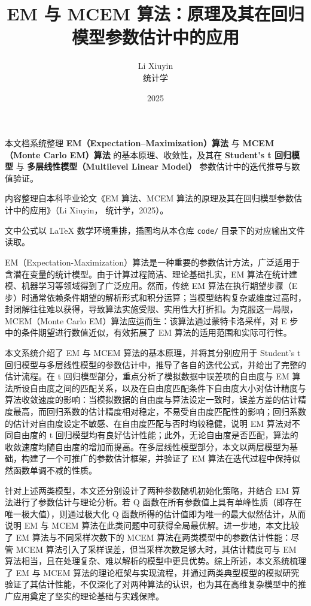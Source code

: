 \documentclass[12pt,a4paper]{ctexart}
\title{\bfseries EM 与 MCEM 算法：原理及其在回归模型参数估计中的应用}
\author{Li Xiuyin\\[2pt]\normalsize 统计学}
\date{2025}
\numberwithin{figure}{section}
\numberwithin{table}{section}
\begin{document}
\maketitle


\begin{framed}
本文档系统整理 \textbf{EM（Expectation–Maximization）算法} 与 \textbf{MCEM（Monte Carlo EM）算法} 的基本原理、收敛性，及其在 \textbf{Student's t 回归模型} 与 \textbf{多层线性模型（Multilevel Linear Model）} 参数估计中的迭代推导与数值验证。

内容整理自本科毕业论文《EM 算法、MCEM 算法的原理及其在回归模型参数估计中的应用》（Li Xiuyin， 统计学，2025）。

文中公式以 LaTeX 数学环境重排，插图均从本仓库 \texttt{code/} 目录下的对应输出文件读取。

\end{framed}

EM（Expectation-Maximization）算法是一种重要的参数估计方法，广泛适用于含潜在变量的统计模型。由于计算过程简洁、理论基础扎实，EM 算法在统计建模、机器学习等领域得到了广泛应用。然而，传统 EM 算法在执行期望步骤（E 步）时通常依赖条件期望的解析形式和积分运算；当模型结构复杂或维度过高时，封闭解往往难以获得，导致算法实施受限、实用性大打折扣。为克服这一局限，MCEM（Monte Carlo EM）算法应运而生：该算法通过蒙特卡洛采样，对 E 步中的条件期望进行数值近似，有效拓展了 EM 算法的适用范围和实际可行性。

本文系统介绍了 EM 与 MCEM 算法的基本原理，并将其分别应用于 Student's t 回归模型与多层线性模型的参数估计中，推导了各自的迭代公式，并给出了完整的估计流程。在 t 回归模型部分，重点分析了模拟数据中误差项的自由度与 EM 算法所设自由度之间的匹配关系，以及在自由度匹配条件下自由度大小对估计精度与算法收敛速度的影响：当模拟数据的自由度与算法设定一致时，误差方差的估计精度最高，而回归系数的估计精度相对稳定，不易受自由度匹配性的影响；回归系数的估计对自由度设定不敏感、在自由度匹配与否时均较稳健，说明 EM 算法对不同自由度的 t 回归模型均有良好估计性能；此外，无论自由度是否匹配，算法的收敛速度均随自由度的增加而提高。在多层线性模型部分，本文以两层模型为基础，构建了一个可推广的参数估计框架，并验证了 EM 算法在迭代过程中保持似然函数单调不减的性质。

针对上述两类模型，本文还分别设计了两种参数随机初始化策略，并结合 EM 算法进行了参数估计与理论分析。若 Q 函数在所有参数值上具有单峰性质（即存在唯一极大值），则通过极大化 Q 函数所得的估计值即为唯一的最大似然估计，从而说明 EM 与 MCEM 算法在此类问题中可获得全局最优解。进一步地，本文比较了 EM 算法与不同采样次数下的 MCEM 算法在两类模型中的参数估计性能：尽管 MCEM 算法引入了采样误差，但当采样次数足够大时，其估计精度可与 EM 算法相当，且在处理复杂、难以解析的模型中更具优势。综上所述，本文系统梳理了 EM 与 MCEM 算法的理论框架与实现流程，并通过两类典型模型的模拟研究验证了其估计性能，不仅深化了对两种算法的认识，也为其在高维复杂模型中的推广应用奠定了坚实的理论基础与实践保障。
\end{document}
